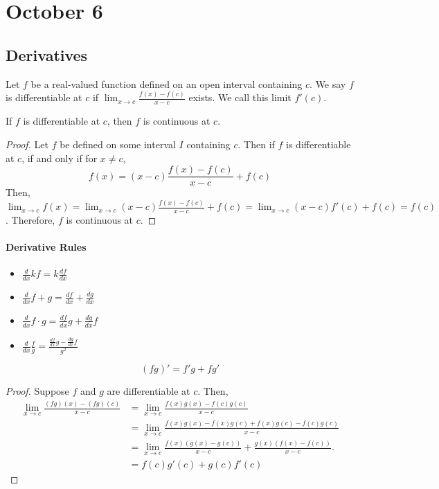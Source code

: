 \section{October 6}

\subsection{Derivatives}
\begin{definition}[Derivative]
    Let $f$ be a real-valued function defined on an open interval containing $c$. We say $f$ is differentiable at $c$ if $\lim_{x \to c} \frac{f(x) - f(c)}{x - c}$ exists. We call this limit $f'(c)$.
\end{definition}

\begin{theorem}
    If $f$ is differentiable at $c$, then $f$ is continuous at $c$.
\end{theorem}
\begin{proof}
    Let $f$ be defined on some interval $I$ containing $c$. Then if $f$ is differentiable at $c$, if and only if for $x \neq c$, $$f(x) = (x - c) \frac{f(x) - f(c)}{x - c} + f(c)$$ Then, $\lim_{x \to c} f(x) = \lim_{x \to c} (x - c) \frac{f(x) - f(c)}{x - c} + f(c) = \lim_{x \to c} (x - c) f'(c) + f(c) = f(c)$. Therefore, $f$ is continuous at $c$.
\end{proof}

\paragraph{Derivative Rules}
\begin{itemize}
    \item $\frac{d}{dx} kf = k \frac{df}{dx}$
    \item $\frac{d}{dx} f + g = \frac{df}{dx} + \frac{dg}{dx}$
    \item $\frac{d}{dx} f \cdot g = \frac{df}{dx} g + \frac{dg}{dx} f$
    \item $\frac{d}{dx} \frac{f}{g} = \frac{\frac{df}{dx} g - \frac{dg}{dx} f}{g^2}$
\end{itemize}

\begin{theorem}
    $$(fg)' = f'g + fg'$$
\end{theorem}
\begin{proof}
    Suppose $f$ and $g$ are differentiable at $c$. Then,
    \begin{align*}
        \lim_{x \to c} \frac{(fg)(x) - (fg)(c)}{x - c} &= \lim_{x \to c} \frac{f(x)g(x) - f(c)g(c)}{x - c} \\
        &= \lim_{x \to c} \frac{f(x)g(x) - f(x)g(c) + f(x)g(c) - f(c)g(c)}{x - c} \\
        &= \lim_{x \to c} \frac{f(x) (g(x) - g(c))}{x - c} + \frac{g(x) (f(x) - f(c))}{x - c}. \\
        &= f(c)g'(c) + g(c)f'(c)
    \end{align*}
\end{proof}

